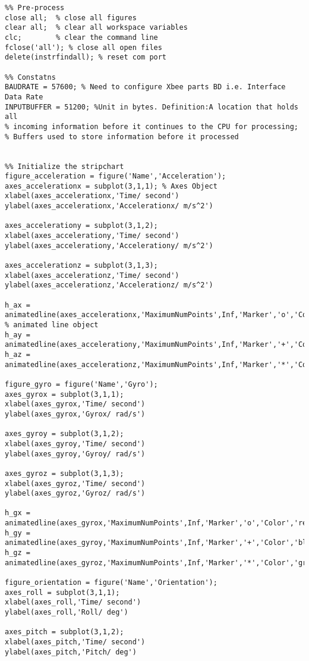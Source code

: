 \begin{lstlisting}
%% Pre-process
close all;  % close all figures
clear all;  % clear all workspace variables
clc;        % clear the command line
fclose('all'); % close all open files
delete(instrfindall); % reset com port 

%% Constatns
BAUDRATE = 57600; % Need to configure Xbee parts BD i.e. Interface Data Rate
INPUTBUFFER = 51200; %Unit in bytes. Definition:A location that holds all 
% incoming information before it continues to the CPU for processing; 
% Buffers used to store information before it processed


%% Initialize the stripchart
figure_acceleration = figure('Name','Acceleration');
axes_accelerationx = subplot(3,1,1); % Axes Object
xlabel(axes_accelerationx,'Time/ second')
ylabel(axes_accelerationx,'Accelerationx/ m/s^2')

axes_accelerationy = subplot(3,1,2);
xlabel(axes_accelerationy,'Time/ second')
ylabel(axes_accelerationy,'Accelerationy/ m/s^2')

axes_accelerationz = subplot(3,1,3);
xlabel(axes_accelerationz,'Time/ second')
ylabel(axes_accelerationz,'Accelerationz/ m/s^2')

h_ax = animatedline(axes_accelerationx,'MaximumNumPoints',Inf,'Marker','o','Color','red'); % animated line object
h_ay = animatedline(axes_accelerationy,'MaximumNumPoints',Inf,'Marker','+','Color','blue');
h_az = animatedline(axes_accelerationz,'MaximumNumPoints',Inf,'Marker','*','Color','green');

figure_gyro = figure('Name','Gyro');
axes_gyrox = subplot(3,1,1);
xlabel(axes_gyrox,'Time/ second')
ylabel(axes_gyrox,'Gyrox/ rad/s')

axes_gyroy = subplot(3,1,2);
xlabel(axes_gyroy,'Time/ second')
ylabel(axes_gyroy,'Gyroy/ rad/s')

axes_gyroz = subplot(3,1,3);
xlabel(axes_gyroz,'Time/ second')
ylabel(axes_gyroz,'Gyroz/ rad/s')

h_gx = animatedline(axes_gyrox,'MaximumNumPoints',Inf,'Marker','o','Color','red');
h_gy = animatedline(axes_gyroy,'MaximumNumPoints',Inf,'Marker','+','Color','blue');
h_gz = animatedline(axes_gyroz,'MaximumNumPoints',Inf,'Marker','*','Color','green');

figure_orientation = figure('Name','Orientation');
axes_roll = subplot(3,1,1);
xlabel(axes_roll,'Time/ second')
ylabel(axes_roll,'Roll/ deg')

axes_pitch = subplot(3,1,2);
xlabel(axes_pitch,'Time/ second')
ylabel(axes_pitch,'Pitch/ deg')


\end{lstlisting}
